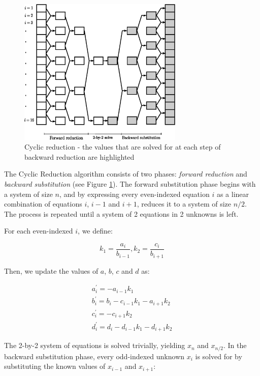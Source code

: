 \documentclass{elsarticle}
\begin{document}
\begin{figure}[h!]
\begin{center}
\includegraphics[height=200pt]{img/cyclic-reduction.eps}
\end{center}
\caption{Cyclic reduction -
the values that are solved for at each step of backward reduction
are highlighted}
\label{fig:cyclic-reduction}
\end{figure}

The Cyclic Reduction algorithm consists of two phases:
\emph{forward reduction} and \emph{backward substitution}
(see Figure \ref{fig:cyclic-reduction}).
The forward substitution phase begins with a system of size $n$,
and by expressing every even-indexed equation $i$ as a linear
combination of equations $i$, $i-1$ and $i+1$, reduces it to a
system of size $n/2$.
The process is repeated until a system of 2 equations in 2 unknowns
is left.

For each even-indexed $i$, we define:

\begin{equation*}
k_1 = \frac{a_i}{b_{i-1}},
k_2 = \frac{c_i}{b_{i+1}}
\end{equation*}

Then, we update the values of $a$, $b$, $c$ and $d$ as:

\begin{align} \label{eqn:forward-reduction}
& a^{\prime}_i = -a_{i-1}k_1 & \\
& b^{\prime}_i = b_i - c_{i-1}k_1 - a_{i+1}k_2 & \\
& c^{\prime}_i = -c_{i+1}k_2 & \\
& d^{\prime}_i = d_i - d_{i-1}k_1  - d_{i+1}k_2 &
\end{align}

The 2-by-2 system of equations is solved trivially,
yielding $x_n$ and $x_{n/2}$.
In the backward substitution phase,
every odd-indexed unknown $x_i$ is solved for by
substituting the known values of $x_{i-1}$ and $x_{i+1}$:
\end{document}
